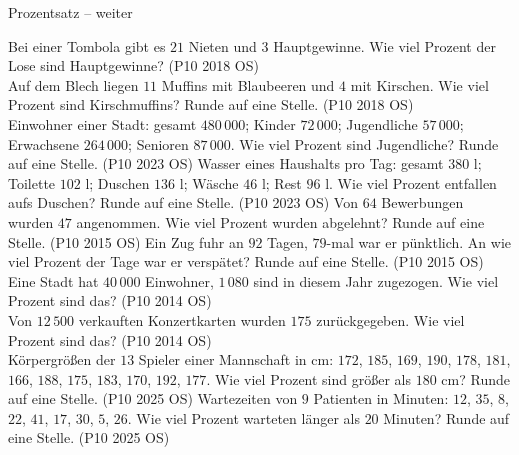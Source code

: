 \begin{aufgabe}{Prozentsatz – weiter}
\begin{teile}
\teil Bei einer Tombola gibt es $21$ Nieten und $3$ Hauptgewinne. Wie viel Prozent der Lose sind Hauptgewinne? \hfill (P10 2018 OS) \\ \leerfeld[\%]
\teil Auf dem Blech liegen $11$ Muffins mit Blaubeeren und $4$ mit Kirschen. Wie viel Prozent sind Kirschmuffins? Runde auf eine Stelle. \hfill (P10 2018 OS) \\ \leerfeld[\%]
\teil Einwohner einer Stadt: gesamt $480\,000$; Kinder $72\,000$; Jugendliche $57\,000$; Erwachsene $264\,000$; Senioren $87\,000$. Wie viel Prozent sind Jugendliche? Runde auf eine Stelle. \hfill (P10 2023 OS)
\teil Wasser eines Haushalts pro Tag: gesamt $380$ l; Toilette $102$ l; Duschen $136$ l; Wäsche $46$ l; Rest $96$ l. Wie viel Prozent entfallen aufs Duschen? Runde auf eine Stelle. \hfill (P10 2023 OS)
\teil Von $64$ Bewerbungen wurden $47$ angenommen. Wie viel Prozent wurden abgelehnt? Runde auf eine Stelle. \hfill (P10 2015 OS)
\teil Ein Zug fuhr an $92$ Tagen, $79$-mal war er pünktlich. An wie viel Prozent der Tage war er verspätet? Runde auf eine Stelle. \hfill (P10 2015 OS)
\teil Eine Stadt hat $40\,000$ Einwohner, $1\,080$ sind in diesem Jahr zugezogen. Wie viel Prozent sind das? \hfill (P10 2014 OS) \\ \leerfeld[\%]
\teil Von $12\,500$ verkauften Konzertkarten wurden $175$ zurückgegeben. Wie viel Prozent sind das? \hfill (P10 2014 OS) \\ \leerfeld[\%]
\teil Körpergrößen der $13$ Spieler einer Mannschaft in cm: $172$, $185$, $169$, $190$, $178$, $181$, $166$, $188$, $175$, $183$, $170$, $192$, $177$. Wie viel Prozent sind größer als $180$ cm? Runde auf eine Stelle. \hfill (P10 2025 OS)
\teil Wartezeiten von $9$ Patienten in Minuten: $12$, $35$, $8$, $22$, $41$, $17$, $30$, $5$, $26$. Wie viel Prozent warteten länger als $20$ Minuten? Runde auf eine Stelle. \hfill (P10 2025 OS)
\end{teile}
\end{aufgabe}

